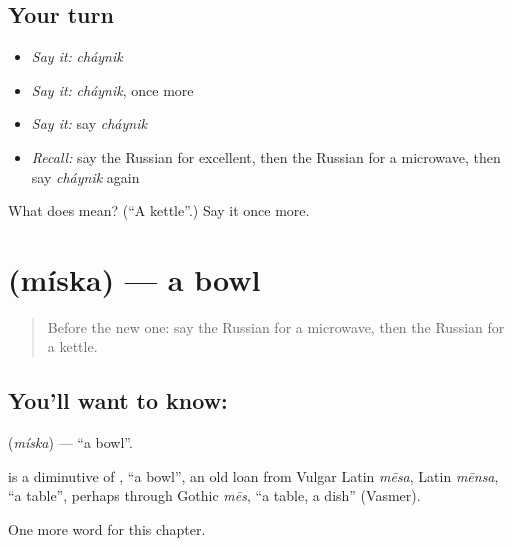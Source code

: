 \subsection*{Your turn}
\begin{itemize}
\raggedright
  \item \emph{Say it:} \emph{cháynik}
  \item \emph{Say it:} \emph{cháynik}, once more
  \item \emph{Say it:} say \emph{cháynik}
  \item \emph{Recall:} say the Russian for excellent, then the Russian for a microwave, then say \emph{cháynik} again
\end{itemize}

\begin{tcolorbox}[breakable,colback=teal!4,colframe=teal!35!black,title={Before you move on}]
What does  mean? (\textquotedblleft{}A kettle\textquotedblright{}.) Say it once more.
\end{tcolorbox}
\section[\texorpdfstring{\ru{миска} (míska)}{миска (míska)}]{ (míska) — a bowl}

\label{lesson:RU-C246-miska}



\begin{quote}
Before the new one: say the Russian for a microwave, then the Russian for a kettle.
\end{quote}

\subsection*{You'll want to know: }
\textbf{} (\emph{míska}) — \textquotedblleft{}a bowl\textquotedblright{}.

\begin{cousinweb}
\textbf{} is a diminutive of \emph{}, \textquotedblleft{}a bowl\textquotedblright{}, an old loan from Vulgar Latin \emph{mēsa}, Latin \emph{mēnsa}, \textquotedblleft{}a table\textquotedblright{}, perhaps through Gothic \emph{mēs}, \textquotedblleft{}a table, a dish\textquotedblright{} (Vasmer).
\end{cousinweb}

\begin{grammarlens}[title={What you've built}]
One more word for this chapter.
\end{grammarlens}

